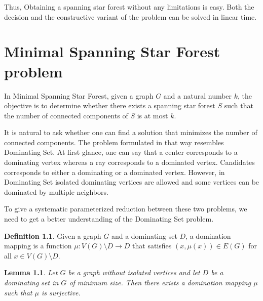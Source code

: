 \documentclass[en]{pracamgr}
\newtheorem{lemma}{Lemma}
\theoremstyle{definition}
\newtheorem{definition}{Definition}
\newcommand{\ssf}{spanning star forest}
\newcommand{\mssfp}{{\sc Minimal Spanning Star Forest}}
\newcommand{\domsetp}{{\sc Dominating Set}}
\begin{document}
Thus, Obtaining a \ssf{} without any limitations is easy. Both the decision and the constructive variant of the problem can be solved in linear time.

\chapter{Minimal Spanning Star Forest problem}\label{sec4}

In \mssfp{}, given a graph $G$ and a natural number $k$, the objective is to determine whether there exists a \ssf{} $S$ such that the number of connected components of $S$ is at most $k$.

It is natural to ask whether one can find a solution that minimizes the number of connected components. The problem formulated in that way resembles \domsetp{}. At first glance, one can say that a center corresponds to a dominating vertex whereas a ray corresponds to a dominated vertex. Candidates corresponds to either a dominating or a dominated vertex. However, in \domsetp{} isolated dominating vertices are allowed and some vertices can be dominated by multiple neighbors. 

To give a systematic parameterized reduction between these two problems, we need to get a better understanding of the \domsetp{} problem.

\begin{definition}
	Given a graph $G$ and a dominating set $D$, a {\normalfont domination mapping} is a function $\mu:V(G) \setminus D \rightarrow D$ that satisfies $(x,\mu(x)) \in E(G)$ for all $x \in V(G) \setminus D$.
\end{definition}

\begin{lemma}\label{dom mapping}
	Let $G$ be a graph without isolated vertices and let $D$ be a dominating set in $G$ of minimum size. Then there exists a domination mapping $\mu$ such that $\mu$ is surjective.
\end{lemma}
\end{document}
